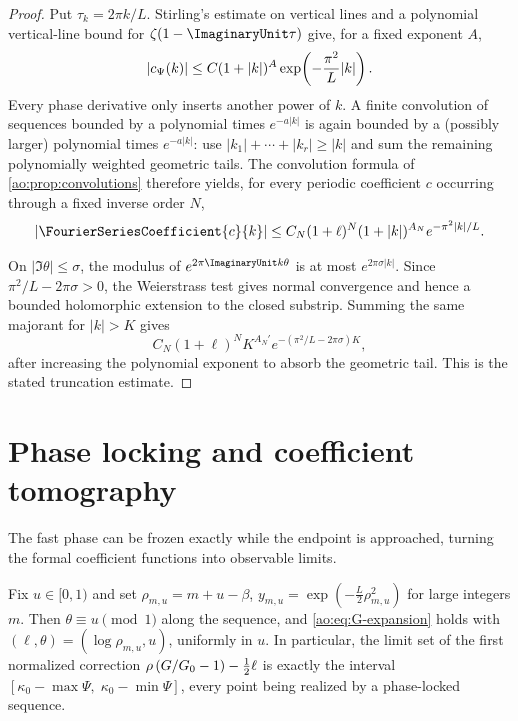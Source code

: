 \begin{proof}
Put $\tau_k=2\pi k/L$.  Stirling's estimate on vertical lines and a
polynomial vertical-line bound for $\zeta(1-\ImaginaryUnit\tau)$ give, for a
fixed exponent $A$,
\[
 |c_{\Psi}(k)|\le C(1+|k|)^A
 \exp\!\left(-\frac{\pi^2}{L}|k|\right).
\]
Every phase derivative only inserts another power of $k$.  A finite
convolution of sequences bounded by a polynomial times
$e^{-a|k|}$ is again bounded by a (possibly larger) polynomial times
$e^{-a|k|}$: use
$|k_1|+\cdots+|k_r|\ge|k|$ and sum the remaining polynomially weighted
geometric tails.  The convolution formula of
\cref{ao:prop:convolutions} therefore yields, for every periodic
coefficient $c$ occurring through a fixed inverse order $N$,
\[
 |\FourierSeriesCoefficient{c}{k}|\le C_N(1+\ell)^N(1+|k|)^{A_N}
 e^{-\pi^2|k|/L}.
\]

On $|\Im\theta|\le\sigma$, the modulus of
$e^{2\pi\ImaginaryUnit k\theta}$ is at most $e^{2\pi\sigma|k|}$.
Since $\pi^2/L-2\pi\sigma>0$, the Weierstrass test gives normal
convergence and hence a bounded holomorphic extension to the closed
substrip.  Summing the same majorant for $|k|>K$ gives
\[
 C_N(1+\ell)^N K^{A_N'}
 e^{-(\pi^2/L-2\pi\sigma)K},
\]
after increasing the polynomial exponent to absorb the geometric
tail.  This is the stated truncation estimate.
\end{proof}

\section{Phase locking and coefficient tomography}
\label{ao:sec:tomography}

The fast phase can be frozen exactly while the endpoint is
approached, turning the formal coefficient functions into observable
limits.

\begin{theorem}
\label{ao:thm:phase-locked}
Fix $u\in[0,1)$ and set
$\rho_{m,u}=m+u-\beta$,
$y_{m,u}=\exp(-\tfrac L2\rho_{m,u}^{2})$ for large integers $m$.
Then $\theta\equiv u\pmod1$ along the sequence, and
\eqref{ao:eq:G-expansion} holds with
$(\ell,\theta)=(\log\rho_{m,u},u)$, uniformly in $u$.  In
particular, the limit set of the first normalized correction
$\rho\,(G/G_0-1)-\tfrac12\ell$ is exactly the interval
$[\kappa_0-\max\Psi,\;\kappa_0-\min\Psi]$, every point being realized
by a phase-locked sequence.
\end{theorem}

